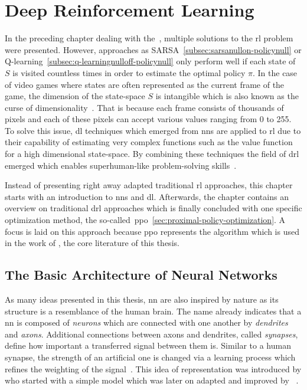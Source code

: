 \documentclass[draft,final]{vutinfth} %
\newcommand{\p}[1]{see p. #1}
\begin{document}
    \glsresetall


    \chapter{Deep Reinforcement Learning}\label{ch:deep-reinforcement-learning}


    In the preceding chapter dealing with the~, multiple solutions to the \gls{rl} problem were presented.
    However, approaches as SARSA~\eqref{subsec:sarsanullon-policynull} or Q-learning~\eqref{subsec:q-learningnulloff-policynull} only perform well if each state of $\mathit{S}$ is visited countless times in order to estimate the optimal policy $\pi$.
    In the case of video games where states are often represented as the current frame of the game, the dimension of the state-space $\mathit{S}$ is intangible which is also known as the curse of dimensionality~\citep[\p{151}]{goodfellow_deep_2016}.
    That is because each frame consists of thousands of pixels and each of these pixels can accept various values ranging from 0 to 255.
    To solve this issue, \gls{dl} techniques which emerged from \glspl{nn} are applied to \gls{rl} due to their capability of estimating very complex functions such as the value function for a high dimensional state-space.
    By combining these techniques the field of \gls{drl} emerged which enables superhuman-like problem-solving skills~\citep{francois-lavet_introduction_2018}.

    Instead of presenting right away adapted traditional \gls{rl} approaches, this chapter starts with an introduction to \glspl{nn} and \gls{dl}.
    Afterwards, the chapter contains an overview on traditional \gls{drl} approaches which is finally concluded with one specific optimization method, the so-called~\gls{ppo}~\eqref{sec:proximal-policy-optimization}.
    A focus is laid on this approach because \gls{ppo} represents the algorithm which is used in the work of \citeauthor{burda_large-scale_2018-1}, the core literature of this thesis.


    \section{The Basic Architecture of Neural Networks}\label{subsec:the-basic-architecture-of-neural-networks}


    As many ideas presented in this thesis, \gls{nn} are also inspired by nature as its structure is a resemblance of the human brain.
    The name already indicates that a \gls{nn} is composed of \textit{neurons} which are connected with one another by \textit{dendrites} and \textit{axons}.
    Additional connections between axons and dendrites, called \textit{synapses}, define how important a transferred signal between them is.
    Similar to a human synapse, the strength of an artificial one is changed via a learning process which refines the weighting of the signal~\citep[\p{1f}]{aggarwal_neural_2018}.
    This idea of representation was introduced by \citeauthor{mcculloch_logical_1943} who started with a simple model which was later on adapted and improved by \citeauthor{rosenblatt_perceptron_1957}~\citep[\p{167}]{awad_deep_2015}.
\end{document}
